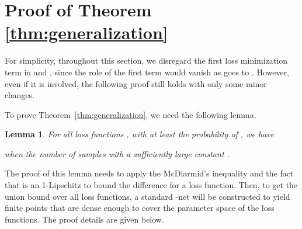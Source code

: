 \documentclass[11pt,fullpage, letterpaper,twoside]{article}
\newtheorem{lemma}{Lemma}
\newcommand{\1}[1]{\mathds{1}_{\left[#1\right]}}
\begin{document}
\section{Proof of Theorem \ref{thm:generalization}}\label{sec:gen_proof}
For simplicity, throughout this section, we disregard the first loss minimization term in  and , since the role of the first term would vanish as  goes to . However, even if it is involved, the following proof still holds with only some minor changes.





To prove Theorem~\ref{thm:generalization}, we need the following lemma.
\begin{lemma}
For all loss functions , with at least the probability of , we have

when the number of samples 
with a sufficiently large constant .
\end{lemma}
The proof of this lemma needs to apply the McDiarmid's inequality and the fact that  is an 1-Lipschitz
to bound the difference  for a loss function.  Then, to get the union bound over all loss functions, a standard -net \cite{arora2017generalization} will be constructed to yield finite points that are dense enough to cover the parameter space of the loss functions. The proof details are given below.
\end{document}
